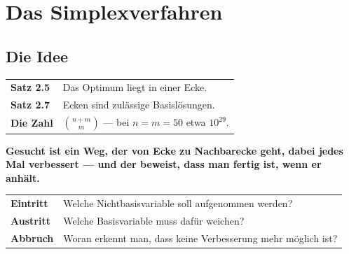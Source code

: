 \chapter{Das Simplexverfahren}

\section{Die Idee}

\begin{merksatz}
\begin{center}
{\small
\renewcommand{\arraystretch}{1.5}
\begin{tabular}{@{}P{2.4cm}P{6.2cm}@{}}
\toprule
\textbf{Satz 2.5} & Das Optimum liegt in einer Ecke.\\
\textbf{Satz 2.7} & Ecken sind zulässige Basislösungen.\\
\textbf{Die Zahl} & $\binom{n+m}{m}$ --- bei $n=m=50$ etwa $10^{29}$.\\
\bottomrule
\end{tabular}}
\end{center}

\begin{center}
\begin{minipage}{0.9\textwidth}
\textbf{Gesucht ist ein Weg, der von Ecke zu Nachbarecke geht, dabei jedes Mal verbessert --- und der beweist, dass man fertig ist, wenn er anhält.}
\end{minipage}
\end{center}

\begin{center}
{\small
\renewcommand{\arraystretch}{1.5}
\begin{tabular}{@{}P{2.4cm}P{6.2cm}@{}}
\toprule
\textbf{Eintritt} & Welche Nichtbasisvariable soll aufgenommen werden?\\
\textbf{Austritt} & Welche Basisvariable muss dafür weichen?\\
\textbf{Abbruch} & Woran erkennt man, dass keine Verbesserung mehr möglich ist?\\
\bottomrule
\end{tabular}}
\end{center}

\begin{center}
\begin{minipage}{0.88\textwidth}
\end{minipage}
\end{center}
\end{merksatz}

